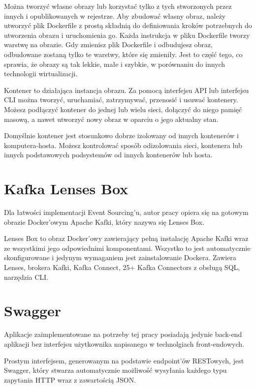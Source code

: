 Można tworzyć własne obrazy lub korzystać tylko z tych stworzonych przez innych i opublikowanych w rejestrze. Aby zbudować własny obraz, należy utworzyć plik Dockerfile z prostą składnią do definiowania kroków potrzebnych do utworzenia obrazu i uruchomienia go. Każda instrukcja w pliku Dockerfile tworzy warstwę na obrazie. Gdy zmienisz plik Dockerfile i odbudujesz obraz, odbudowane zostaną tylko te warstwy, które się zmieniły. Jest to część tego, co sprawia, że obrazy są tak lekkie, małe i szybkie, w porównaniu do innych technologii wirtualizacji.

Kontener to działająca instancja obrazu. Za pomocą interfejsu API lub interfejsu CLI można tworzyć, uruchamiać, zatrzymywać, przenosić i usuwać kontenery. Możesz podłączyć kontener do jednej lub wielu sieci, dołączyć do niego pamięć masową, a nawet utworzyć nowy obraz w oparciu o jego aktualny stan.

Domyślnie kontener jest stosunkowo dobrze izolowany od innych kontenerów i komputera-hosta. Możesz kontrolować sposób odizolowania sieci, kontenera lub innych podstawowych podsystemów od innych kontenerów lub hosta. \cite{Docker2}

\section{Kafka Lenses Box}
Dla łatwości implementacji Event Sourcing'u, autor pracy opiera się na gotowym obrazie Docker'owym Apache Kafki, który nazywa się Lenses Box.  

Lenses Box to obraz Docker'owy zawierający pełną instalację Apache Kafki wraz ze wszystkimi jego odpowiednimi komponentami. Wszystko to jest automatycznie skonfigurowane i jedynym wymaganiem jest zainstalowanie Dockera. Zawiera Lenses, brokera Kafki, Kafka Connect, 25+ Kafka Connectors z obsługą SQL, narzędzia CLI. \cite{Lenses}

\section{Swagger}
Aplikacje zaimplementowane na potrzeby tej pracy posiadają jedynie back-end aplikacji bez interfejsu użytkownika napisanego w technolgiach front-endowych. 

Prostym interfejsem, generowanym na podstawie endpoint'ów RESTowych, jest Swagger, który stwarza automatycznie możliwość wysyłania każdego typu zapytania HTTP wraz z zawartością JSON.

